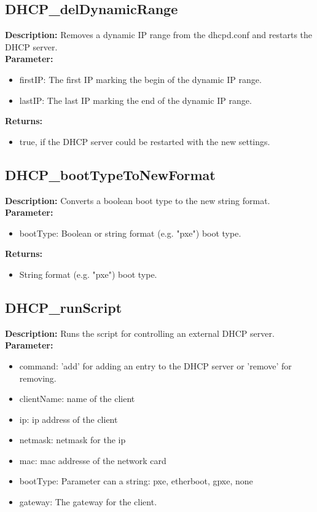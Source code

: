 \subsection{DHCP\_delDynamicRange}
\textbf{Description:} Removes a dynamic IP range from the dhcpd.conf and restarts the DHCP server.\\
\textbf{Parameter:}
\begin{itemize}
\item firstIP: The first IP marking the begin of the dynamic IP range.
\item lastIP: The last IP marking the end of the dynamic IP range.
\end{itemize}
\textbf{Returns:}
\begin{itemize}
\item true, if the DHCP server could be restarted with the new settings.
\end{itemize}

\subsection{DHCP\_bootTypeToNewFormat}
\textbf{Description:} Converts a boolean boot type to the new string format.\\
\textbf{Parameter:}
\begin{itemize}
\item bootType: Boolean or string format (e.g. "pxe") boot type.
\end{itemize}
\textbf{Returns:}
\begin{itemize}
\item String format (e.g. "pxe") boot type.
\end{itemize}

\subsection{DHCP\_runScript}
\textbf{Description:} Runs the script for controlling an external DHCP server.\\
\textbf{Parameter:}
\begin{itemize}
\item command: 'add' for adding an entry to the DHCP server or 'remove' for removing.
\item clientName: name of the client
\item ip: ip address of the client
\item netmask: netmask for the ip
\item mac: mac addresse of the network card
\item bootType: Parameter can a string: pxe, etherboot, gpxe, none
\item gateway: The gateway for the client.
\end{itemize}

